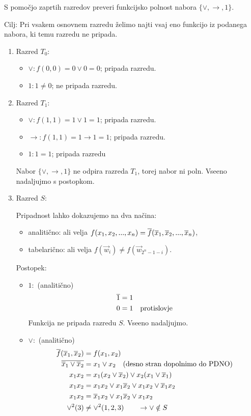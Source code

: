 \begin{zgled}
S pomočjo zaprtih razredov preveri funkcijsko polnost nabora $\{\vee,\rightarrow,1\}$.
\end{zgled}
\begin{resitev}
Cilj: Pri vsakem osnovnem razredu želimo najti vsaj eno funkcijo iz podanega nabora, ki temu razredu ne pripada.

\begin{enumerate}
\item Razred $T_0$:
\begin{itemize}
\item $\vee: f(0,0) = 0 \vee 0 = 0$; pripada razredu.
\item $1: 1 \neq 0$; ne pripada razredu.
\end{itemize}

\item Razred $T_1$:
\begin{itemize}
\item $\vee: f(1,1) = 1 \vee 1 = 1$; pripada razredu.
\item $\rightarrow: f(1,1) = 1 \rightarrow 1 = 1$; pripada razredu.
\item $1: 1 = 1$; pripada razredu
\end{itemize}
Nabor $\{\vee,\rightarrow,1\}$ ne odpira razreda $T_1$, torej nabor ni poln. Vseeno nadaljujmo s postopkom.

\item Razred $S$:

Pripadnost lahko dokazujemo na dva načina:
\begin{itemize}
\item analitično: ali velja $f(x_1,x_2,...,x_n) = \overline f(\overline x_1, \overline x_2,...,\overline x_n)$,
\item tabelarično: ali velja $f(\vec{w}_i) \neq f(\vec{w}_{2^n-1-i})$.
\end{itemize}

Postopek:
\begin{itemize}
\item $1:$ (analitično)\\
\begin{align*}
\overline 1 & = 1\\
0 & = 1 \quad \text{protislovje}
\end{align*}
Funkcija ne pripada razredu $S$. Vseeno nadaljujmo.

\item $\vee:$ (analitično)\\
\begin{align*}
\overline f (\overline x_1, \overline x_2) & = f(x_1,x_2)\\
\overline{\overline x_1 \vee \overline x_2} & = x_1 \vee x_2 \quad \text{(desno stran dopolnimo do PDNO)} \\
x_1 x_2 & = x_1(x_2 \vee \overline x_2) \vee x_2 (x_1 \vee \overline x_1)\\
x_1 x_2 & = x_1 x_2 \vee x_1 \overline x_2 \vee x_1 x_2 \vee \overline x_1 x_2\\
x_1 x_2 & = \overline x_1 x_2 \vee x_1 \overline x_2 \vee x_1 x_2\\
\vee^2(3) & \neq \vee^2(1,2,3) \qquad \rightarrow \vee \notin S
\end{align*}


\end{itemize}
\end{enumerate}
\end{resitev}
